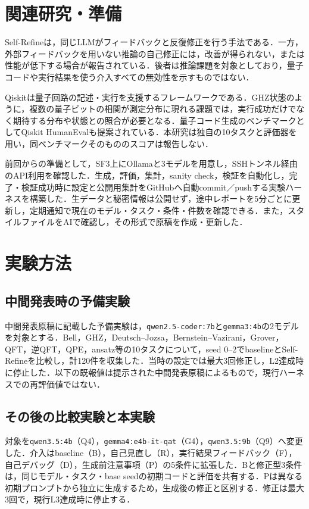 \documentclass[a4paper,8pt,twocolumn]{extarticle}
\begin{document}
\section{関連研究・準備}
Self-Refineは，同じLLMがフィードバックと反復修正を行う手法である\cite{selfrefine}．一方，外部フィードバックを用いない推論の自己修正には，改善が得られない，または性能が低下する場合が報告されている\cite{huang}．後者は推論課題を対象としており，量子コードや実行結果を使う介入すべての無効性を示すものではない．

Qiskitは量子回路の記述・実行を支援するフレームワークである\cite{qiskit}．GHZ状態のように，複数の量子ビットの相関が測定分布に現れる課題では，実行成功だけでなく期待する分布や状態との照合が必要となる．量子コード生成のベンチマークとしてQiskit HumanEvalも提案されている\cite{qhumaneval}．本研究は独自の10タスクと評価器を用い，同ベンチマークそのもののスコアは報告しない．

前回からの準備として，SF3上にOllamaと3モデルを用意し，SSHトンネル経由のAPI利用を確認した．生成，評価，集計，sanity check，検証を自動化し，完了・検証成功時に設定と公開用集計をGitHubへ自動commit／pushする実験ハーネスを構築した．生データと秘密情報は公開せず，途中レポートを5分ごとに更新し，定期通知で現在のモデル・タスク・条件・件数を確認できる．また，スタイルファイルをAIで確認し，その形式で原稿を作成・更新した．

\section{実験方法}
\subsection{中間発表時の予備実験}
中間発表原稿に記載した予備実験は，\texttt{qwen2.5-coder:7b}と\texttt{gemma3:4b}の2モデルを対象とする．Bell，GHZ，Deutsch--Jozsa，Bernstein--Vazirani，Grover，QFT，逆QFT，QPE，ansatz等の10タスクについて，seed 0--2でbaselineとSelf-Refineを比較し，計120件を収集した．当時の設定では最大3回修正し，L2達成時に停止した．以下の既報値は提示された中間発表原稿によるもので，現行ハーネスでの再評価値ではない．

\subsection{その後の比較実験と本実験}
対象を\texttt{qwen3.5:4b}（Q4），\texttt{gemma4:e4b-it-qat}（G4），\texttt{qwen3.5:9b}（Q9）へ変更した．介入はbaseline（B），自己見直し（R），実行結果フィードバック（F），自己デバッグ（D），生成前注意事項（P）の5条件に拡張した．Bと修正型3条件は，同じモデル・タスク・base seedの初期コードと評価を共有する．Pは異なる初期プロンプトから独立に生成するため，生成後の修正と区別する．修正は最大3回で，現行L3達成時に停止する．
\end{document}
